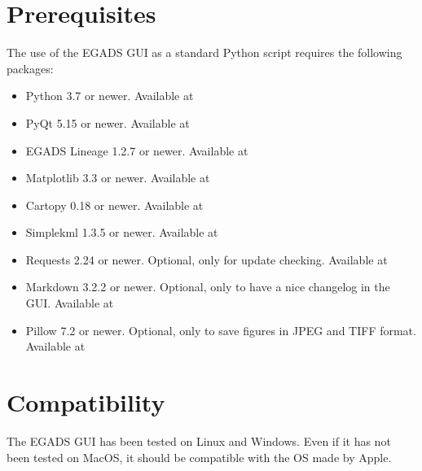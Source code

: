 \documentclass[a4paper,10pt,openany,english]{sphinxmanual}
\begin{document}
\section{Prerequisites}
\label{\detokenize{install:prerequisites}}
The use of the EGADS GUI as a standard Python script requires the following packages:
\begin{itemize}
\item {} 
Python 3.7 or newer. Available at 

\item {} 
PyQt 5.15 or newer. Available at 

\item {} 
EGADS Lineage 1.2.7 or newer. Available at 

\item {} 
Matplotlib 3.3 or newer. Available at 

\item {} 
Cartopy 0.18 or newer. Available at 

\item {} 
Simplekml 1.3.5 or newer. Available at 

\item {} 
Requests 2.24 or newer. Optional, only for update checking. Available at 

\item {} 
Markdown 3.2.2 or newer. Optional, only to have a nice changelog in the GUI. Available at 

\item {} 
Pillow 7.2 or newer. Optional, only to save figures in JPEG and TIFF format. Available at 

\end{itemize}


\section{Compatibility}
\label{\detokenize{install:compatibility}}
The EGADS GUI has been tested on Linux and Windows. Even if it has not been tested on MacOS, it should be compatible with the OS made by Apple.
\end{document}
